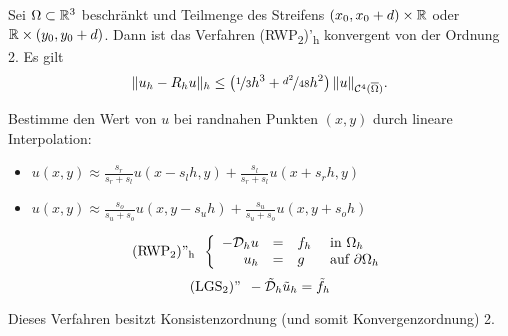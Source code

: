 \documentclass{cheat-sheet}
\newcommand{\Cont}{\mathcal{C}} %
\newcommand{\clos}[1]{\overline{#1}} %
\newcommand{\cOmega}{\clos{\Omega}} %
\newcommand{\bOmega}{\partial \Omega} %
\newcommand{\tss}[1]{\textsubscript{#1}} %
\newcommand{\DO}{\mathcal{D}} %
\begin{document}
\begin{satz}
  Sei $\Omega \subset \mathbb{R}^3$ beschränkt und Teilmenge des Streifens $\left( x_0, x_0 + d \right) \times \mathbb{R}$ oder $\mathbb{R} \times (y_0, y_0 + d)$.
  Dann ist das Verfahren (RWP\tss{2})'\tss{h} konvergent von der Ordnung 2.
  Es gilt
  \[ \norm{u_h - R_h u}_h \leq \left( \nicefrac{1}{3} h^3 + \nicefrac{d^2}{48} h^2 \right) \norm{u}_{\Cont^4(\cOmega)}. \]
\end{satz}



\begin{idee}
  Bestimme den Wert von $u$ bei randnahen Punkten $(x, y)$ durch lineare Interpolation:
  \begin{itemize}
    \item $u(x, y) \approx \frac{s_r}{s_r + s_l} u(x - s_l h, y) + \frac{s_l}{s_r + s_l} u(x+s_r h, y)$
    \item $u(x, y) \approx \frac{s_o}{s_u + s_o} u(x, y - s_u h) + \frac{s_u}{s_u + s_o} u(x, y + s_o h)$
  \end{itemize}
\end{idee}

\[
  \text{(RWP\tss{2})''\tss{h}} \enspace \left\{ \begin{array}{rlll}
    - \DO_h u &=& f_h &\text{ in $\Omega_h$} \\
    u_h &=& g &\text{ auf $\bOmega_h$}
  \end{array} \right.
\]
\[
  \text{(LGS\tss{2})''} \enspace
  - \tilde{\DO}_h \tilde{u}_h = \tilde{f}_h
\]

\begin{lem}
  Dieses Verfahren besitzt Konsistenzordnung (und somit Konvergenzordnung) 2.
\end{lem}

\iffalse
Konsistenz: Mit Taylorn ...

\begin{itemize}
  \item \[ -s_r u_h(x - s_l h, y) + (s_r + s_l) u_h(x, y) - s_l u(x + s_r h, y) = 0 \]
  \item \[ -s_o u_h(x, y - s_u h) + (s_o + s_u) u_h(x, y) - s_u u(x, y + s_o h) = 0 \]
\end{itemize}
\fi

\end{document}
